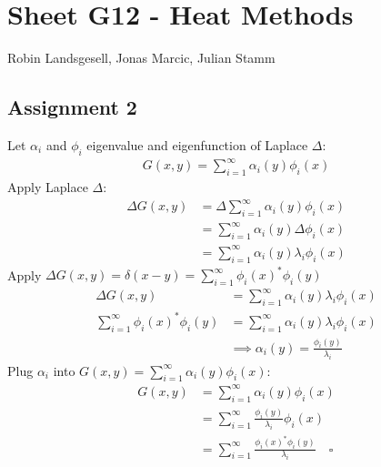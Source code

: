 \documentclass{article}
\begin{document}
\section*{Sheet G12 - Heat Methods}
Robin Landsgesell, Jonas Marcic, Julian Stamm

\subsection*{Assignment 2}
Let $\alpha_i$ and $\phi_i$ eigenvalue and eigenfunction of Laplace $\Delta$:
\begin{align*}
	G(x,y) = \sum_{i=1}^\infty \alpha_i(y)\phi_i(x)
\end{align*}
Apply Laplace $\Delta$:
\begin{align*}
	\Delta G(x,y) &= \Delta\sum_{i=1}^\infty \alpha_i(y)\phi_i(x)\\
	&= \sum_{i=1}^\infty \alpha_i(y)\Delta\phi_i(x)\\
	&= \sum_{i=1}^\infty \alpha_i(y)\lambda_i\phi_i(x)
\end{align*}
Apply $\Delta G(x,y) = \delta(x-y) = \sum_{i=1}^\infty \phi_i(x)^*\phi_i(y)$
\begin{align*}
	\Delta G(x,y) &= \sum_{i=1}^\infty \alpha_i(y)\lambda_i\phi_i(x)\\
	\sum_{i=1}^\infty \phi_i(x)^*\phi_i(y) &= \sum_{i=1}^\infty \alpha_i(y)\lambda_i\phi_i(x)\\
	&\implies \alpha_i(y) = \frac{\phi_i(y)}{\lambda_i}
\end{align*}
Plug $\alpha_i$ into $G(x,y) = \sum_{i=1}^\infty \alpha_i(y)\phi_i(x)$:
\begin{align*}
	G(x,y) &= \sum_{i=1}^\infty \alpha_i(y)\phi_i(x)\\
	&= \sum_{i=1}^\infty \frac{\phi_i(y)}{\lambda_i}\phi_i(x)\\
	&= \sum_{i=1}^\infty \frac{\phi_i(x)^*\phi_i(y)}{\lambda_i} \quad \square
\end{align*}
\end{document}

